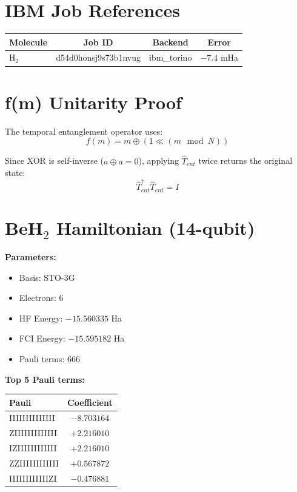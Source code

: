 \documentclass[aps,prx,twocolumn,superscriptaddress,floatfix]{revtex4-2}
\begin{document}
\section{IBM Job References}
\label{sec:sm_jobs}

\begin{table}[htbp]
\begin{ruledtabular}
\begin{tabular}{lccc}
Molecule & Job ID & Backend & Error \\
\hline
H$_2$ & d54d0honsj9s73b1nvug & ibm\_torino & $-7.4$ mHa \\
\end{tabular}
\end{ruledtabular}
\end{table}

\section{f(m) Unitarity Proof}
\label{sec:sm_unitarity}

The temporal entanglement operator uses:
\begin{equation}
f(m) = m \oplus (1 \ll (m \mod N))
\end{equation}

Since XOR is self-inverse ($a \oplus a = 0$), applying $\hat{T}_{ent}$ twice returns the original state:
\begin{equation}
\hat{T}_{ent}^\dagger \hat{T}_{ent} = I
\end{equation}

\section{BeH$_2$ Hamiltonian (14-qubit)}
\label{sec:sm_beh2}

\textbf{Parameters:}
\begin{itemize}
    \item Basis: STO-3G
    \item Electrons: 6
    \item HF Energy: $-15.560335$ Ha
    \item FCI Energy: $-15.595182$ Ha
    \item Pauli terms: 666
\end{itemize}

\textbf{Top 5 Pauli terms:}
\begin{table}[htbp]
\begin{ruledtabular}
\begin{tabular}{lc}
Pauli & Coefficient \\
\hline
IIIIIIIIIIIIII & $-8.703164$ \\
ZIIIIIIIIIIIII & $+2.216010$ \\
IZIIIIIIIIIIII & $+2.216010$ \\
ZZIIIIIIIIIIII & $+0.567872$ \\
IIIIIIIIIIIIZI & $-0.476881$ \\
\end{tabular}
\end{ruledtabular}
\end{table}
\end{document}
